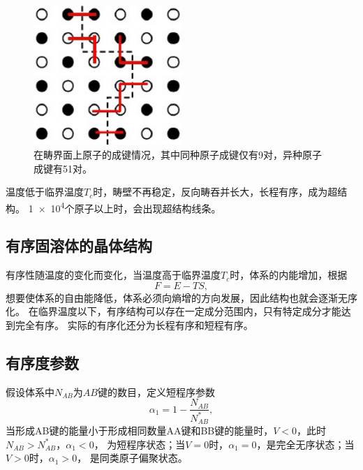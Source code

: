         \begin{figure}[ht]
            \centering
            \includegraphics[width=0.5\textwidth]{fig/bands_near_domian_boundry.jpg}
            \caption{在畴界面上原子的成键情况，其中同种原子成键仅有9对，异种原子成键有51对。}
            \label{畴界面上原子}
        \end{figure}

        温度低于临界温度$T_c$时，畴壁不再稳定，反向畴吞并长大，长程有序，成为超结构。
        \num{1e4}个原子以上时，会出现超结构线条。


        \subsection{有序固溶体的晶体结构}
            有序性随温度的变化而变化，当温度高于临界温度$T_c$时，体系的内能增加，根据
            \begin{equation}
                F=E-TS,
            \end{equation}
            想要使体系的自由能降低，体系必须向熵增的方向发展，因此结构也就会逐渐无序化。    
            在临界温度以下，有序结构可以存在一定成分范围内，只有特定成分才能达到完全有序。
            实际的有序化还分为长程有序和短程有序。
        \subsection{有序度参数}
            假设体系中$N_{AB}$为$AB$键的数目，定义短程序参数
            \begin{equation}
                \alpha_1=1-\frac{N_{AB}}{N_{AB}^*},
            \end{equation}
            当形成AB键的能量小于形成相同数量AA键和BB键的能量时，$V<0$，此时$N_{AB}>N^*_{AB}$，$\alpha_1<0$，
            为短程序状态；当$V=0$时，$\alpha_1=0$，是完全无序状态；当$V>0$时，$\alpha_1>0$，
            是同类原子偏聚状态。

